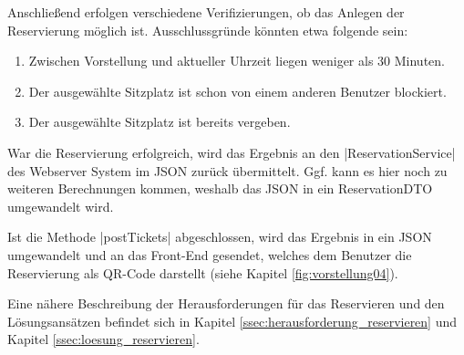 Anschließend erfolgen verschiedene Verifizierungen, ob das Anlegen der Reservierung möglich ist.
Ausschlussgründe könnten etwa folgende sein:
\begin{enumerate}
	\item Zwischen Vorstellung und aktueller Uhrzeit liegen weniger als 30 Minuten.
	\item Der ausgewählte Sitzplatz ist schon von einem anderen Benutzer blockiert.
	\item Der ausgewählte Sitzplatz ist bereits vergeben.
\end{enumerate}
War die Reservierung erfolgreich, wird das Ergebnis an den \jinline|ReservationService| des Webserver System im \acs{JSON} zurück übermittelt. %
Ggf. kann es hier noch zu weiteren Berechnungen kommen, weshalb das \acs{JSON} in ein Reservation\acs{DTO} umgewandelt wird.

Ist die Methode \jinline|postTickets| abgeschlossen, wird das Ergebnis in ein \acs{JSON} umgewandelt und an das Front-End gesendet, welches dem Benutzer die Reservierung als \acs{QR-Code} darstellt (siehe Kapitel \vref{fig:vorstellung04}).

Eine nähere Beschreibung der Herausforderungen für das Reservieren und den Lösungsansätzen befindet sich in Kapitel \vref{ssec:herausforderung_reservieren} und Kapitel \vref{ssec:loesung_reservieren}.
